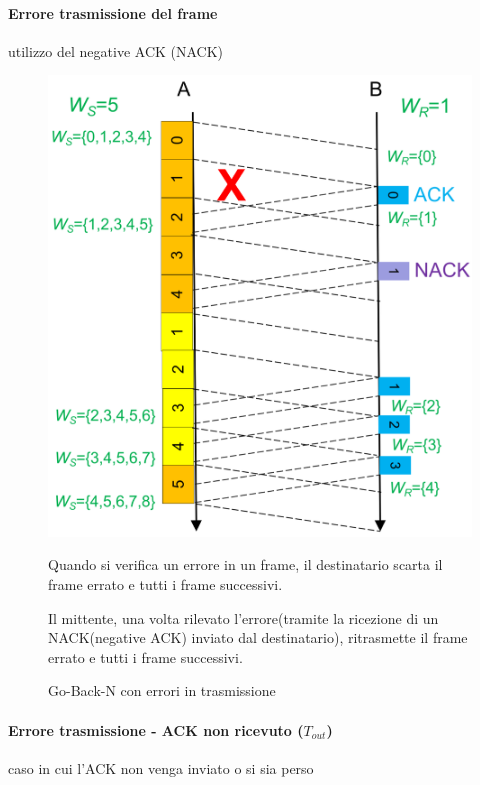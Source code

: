 \paragraph{Errore trasmissione del frame} utilizzo del negative ACK (NACK)
\begin{figure}[htbp]
    \centering
    \begin{minipage}{0.4\textwidth}
        \includegraphics[width=\linewidth]{images/gobackinerrori.png}
        \caption{Go-Back-N con errori in trasmissione}
    \end{minipage}%
    \hfill
    \begin{minipage}{0.55\textwidth}
        Quando si verifica un errore in un frame, il destinatario scarta il frame errato e tutti i frame successivi. 
        
        Il mittente, una volta rilevato l'errore(tramite la ricezione di un NACK(negative ACK) inviato dal destinatario), ritrasmette il frame errato e tutti i frame successivi.
    \end{minipage}
\end{figure}

\paragraph{Errore trasmissione - ACK non ricevuto ($T_{out}$)} caso in cui l'ACK non venga inviato o si sia perso

